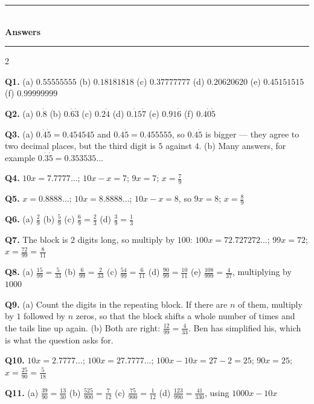 \documentclass[12pt,a4paper]{article}
\newcommand{\heading}[1]{%
  \vspace{2pt}
  {\color{blue!45!black}\rule{\linewidth}{1pt}}\\[1pt]
  {\large\bfseries #1}\\[-6pt]
  {\color{blue!45!black}\rule{\linewidth}{0.4pt}}
  \vspace{2pt}}
\begin{document}
\newpage

\heading{Answers}

{\small
\begin{multicols}{2}
\raggedcolumns
\setlength{\parskip}{4pt}

\textbf{Q1.} (a) $0.55555555$ \quad (b) $0.18181818$ \quad (c) $0.37777777$
\quad (d) $0.20620620$ \quad (e) $0.45151515$ \quad (f) $0.99999999$

\textbf{Q2.} (a) $0.\dot{8}$ \quad (b) $0.\dot{6}\dot{3}$ \quad
(c) $0.2\dot{4}$ \quad (d) $0.\dot{1}5\dot{7}$ \quad (e) $0.91\dot{6}$ \quad
(f) $0.4\dot{0}\dot{5}$

\textbf{Q3.} (a) $0.\dot{4}\dot{5}=0.454545$ and $0.4\dot{5}=0.455555$, so
$0.4\dot{5}$ is bigger --- they agree to two decimal places, but the third
digit is $5$ against $4$. \quad (b) Many answers, for example
$0.\dot{3}\dot{5}=0.353535\ldots$

\textbf{Q4.} $10x=7.7777\ldots$; \; $10x-x=7$; \; $9x=7$; \;
$x=\tfrac{7}{9}$

\textbf{Q5.} $x=0.8888\ldots$; \; $10x=8.8888\ldots$; \;
$10x-x=8$, so $9x=8$; \; $x=\tfrac{8}{9}$

\textbf{Q6.} (a) $\tfrac{2}{9}$ \quad (b) $\tfrac{5}{9}$ \quad
(c) $\tfrac{6}{9}=\tfrac{2}{3}$ \quad (d) $\tfrac{3}{9}=\tfrac{1}{3}$

\textbf{Q7.} The block is $2$ digits long, so multiply by $100$:
$100x=72.727272\ldots$; \; $99x=72$; \; $x=\tfrac{72}{99}=\tfrac{8}{11}$

\textbf{Q8.} (a) $\tfrac{15}{99}=\tfrac{5}{33}$ \quad
(b) $\tfrac{6}{99}=\tfrac{2}{33}$ \quad
(c) $\tfrac{54}{99}=\tfrac{6}{11}$ \quad
(d) $\tfrac{90}{99}=\tfrac{10}{11}$ \quad
(e) $\tfrac{108}{999}=\tfrac{4}{37}$, multiplying by $1000$

\textbf{Q9.} (a) Count the digits in the repeating block. If there are $n$ of
them, multiply by $1$ followed by $n$ zeros, so that the block shifts a whole
number of times and the tails line up again. \quad
(b) Both are right: $\tfrac{12}{99}=\tfrac{4}{33}$. Ben has simplified his,
which is what the question asks for.

\textbf{Q10.} $10x=2.7777\ldots$; \; $100x=27.7777\ldots$; \;
$100x-10x=27-2=25$; \; $90x=25$; \; $x=\tfrac{25}{90}=\tfrac{5}{18}$

\textbf{Q11.} (a) $\tfrac{39}{90}=\tfrac{13}{30}$ \quad
(b) $\tfrac{525}{900}=\tfrac{7}{12}$ \quad
(c) $\tfrac{75}{900}=\tfrac{1}{12}$ \quad
(d) $\tfrac{123}{990}=\tfrac{41}{330}$, using $1000x-10x$


\end{multicols}}
\end{document}
